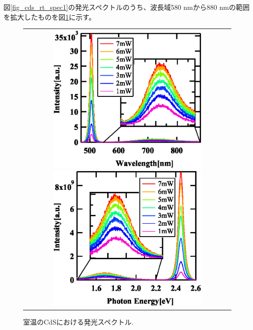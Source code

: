 \documentclass[11pt,a4j]{jsarticle}
\begin{document}
図\ref{fig_cds_rt_spec1}の発光スペクトルのうち、波長域580 nmから880 nmの範囲を拡大したものを図\ref{fig_cds_imp_spec1}に示す。

\newpage
\begin{figure}[ht]
 \centering
 \begin{tabular}{c}

  \begin{minipage}{0.5\hsize}

   \includegraphics[clip,width=8cm]{start2_CdS_imp_Spectrum_wav.eps}
  \end{minipage}

  \begin{minipage}{0.06\hsize}%
    \hspace{5mm}
  \end{minipage}

  \begin{minipage}{0.5\hsize}
   \centering
   \includegraphics[clip,width=8cm]{start2_CdS_imp_Spectrum_eV.eps}
  \end{minipage}
 \end{tabular}
 \caption{室温のCdSにおける発光スペクトル.}
 \label{fig_cds_imp_spec1}

\end{figure}
\end{document}
